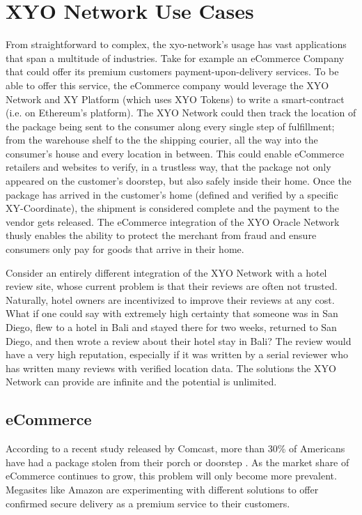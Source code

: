 \documentclass{article}
\begin{document}
\section{XYO Network Use Cases}
From straightforward to complex, the \Gls{xyo-network}'s usage  has vast applications that span a multitude of industries. Take for example an eCommerce Company that could offer its premium customers payment-upon-delivery services. To be able to offer this service, the eCommerce company would leverage the XYO Network and XY Platform (which uses XYO Tokens) to write a \gls{smart-contract} (i.e. on Ethereum's platform). The XYO Network could then track the location of the package being sent to the consumer along every single step of fulfillment; from the warehouse shelf to the the shipping courier, all the way into the consumer's house and every location in between. This could enable eCommerce retailers and websites to verify, in a trustless way, that the package not only appeared on the customer's doorstep, but also safely inside their home. Once the package has arrived in the customer's home (defined and verified by a specific XY-Coordinate), the shipment is considered complete and the payment to the vendor gets released. The eCommerce integration of the XYO Oracle Network thusly enables the ability to protect the merchant from fraud and ensure consumers only pay for goods that arrive in their home.

Consider an entirely different integration of the XYO Network with a hotel review site, whose current problem is that their reviews are often not trusted. Naturally, hotel owners are incentivized to improve their reviews at any cost. What if one could say with extremely high \gls{certainty} that someone was in San Diego, flew to a hotel in Bali and stayed there for two weeks, returned to San Diego, and then wrote a review about their hotel stay in Bali? The review would have a very high reputation, especially if it was written by a serial reviewer who has written many reviews with verified location data. The solutions the XYO Network can provide are infinite and the potential is unlimited.

\subsection{eCommerce}
According to a recent study released by Comcast, more than 30\% of Americans have had a package stolen from their porch or doorstep \cite{comcast-packagesurvey}. As the market share of eCommerce continues to grow, this problem will only become more prevalent. Megasites like Amazon are experimenting with different solutions to offer confirmed secure delivery as a premium service to their customers.
\end{document}

